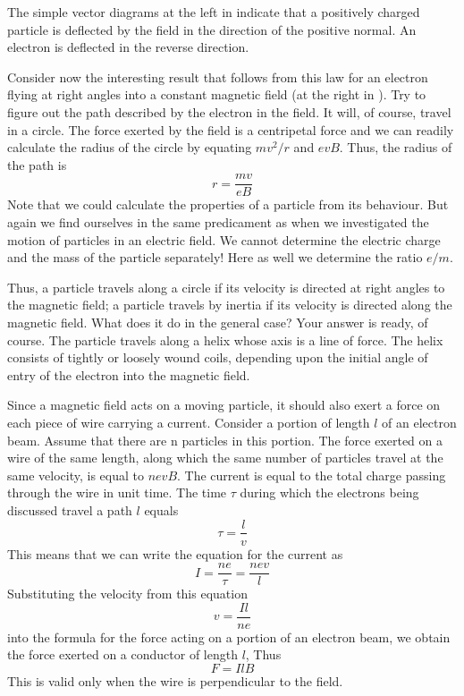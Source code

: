 The simple vector diagrams at the left in  indicate that a positively charged particle is deflected by the field in the direction of the positive normal. An electron is deflected in the reverse direction.

Consider now the interesting result that follows from this law for an electron flying at right angles into a constant magnetic field (at the right in ). Try to figure out the path described by the electron in the field. It will, of course, travel in a circle. The force exerted by the field is a centripetal force and we can readily calculate the radius of the circle by equating $mv^{2}/r$ and $evB$. Thus, the radius of the path is
\begin{equation*}%
r = \frac{mv}{eB}
\end{equation*}
Note that we could calculate the properties of a particle from its behaviour. But again we find ourselves in the same predicament as when we investigated the motion of particles in an electric field. We cannot determine the electric charge and the mass of the particle separately! Here as well we determine the ratio $e/m$.

Thus, a particle travels along a circle if its velocity is directed at right angles to the magnetic field; a particle travels by inertia if its velocity is directed along the magnetic field. What does it do in the general case? Your answer is ready, of course. The particle travels along a helix whose axis is a line of force. The helix consists of tightly or loosely wound coils, depending upon the initial angle of entry of the electron into the magnetic field.

Since a magnetic field acts on a moving particle, it should also exert a force on each piece of wire carrying a current. Consider a portion of length $l$ of an electron beam. Assume that there are n particles in this portion. The force exerted on a wire of the same length, along which the same number of particles travel at the same velocity, is equal to $nevB$. The current is equal to the total charge passing through the wire in unit time. The time $\tau$ during which the electrons being discussed travel a path $l$ equals
\begin{equation*}%
\tau = \frac{l}{v}
\end{equation*}
This means that we can write the equation for the current as
\begin{equation*}%
I  = \frac{ne}{\tau} = \frac{nev}{l} 
\end{equation*}
Substituting the velocity from this equation
\begin{equation*}%
v  = \frac{Il}{ne}
\end{equation*}
into the formula for the force acting on a portion of an electron beam, we obtain the force exerted on a conductor of length $l$, Thus
\begin{equation*}%
F = I l B
\end{equation*}
This is valid only when the wire is perpendicular to the field.

